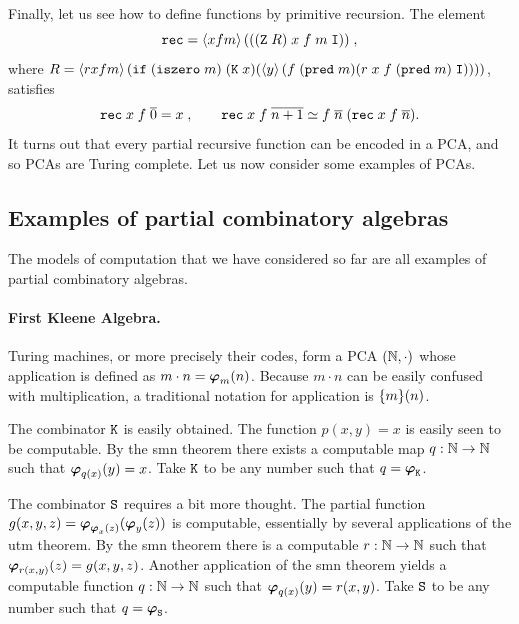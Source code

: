 Finally, let us see how to define functions by primitive recursion.
%
%
%
The element
%
\begin{equation*}
  \mathtt{rec} = \langle x f m \rangle\,(((\mathtt{Z}\; R)\; x\; f\; m\; \mathtt{I})) \;,
\end{equation*}
%
where $R = \langle r x f m \rangle\,(\mathtt{if}\; (\mathtt{iszero}\; m)\; (\mathtt{K}\; x)
  (\langle y \rangle\,(f\; (\mathtt{pred}\; m)(r\; x\; f\; (\mathtt{pred}\; m)\;
    \mathtt{I}))))$, satisfies
%
\begin{equation*}
  \mathtt{rec}\; x\; f\; \overline{0} = x \;,\qquad
  \mathtt{rec}\; x\; f\; \overline{n+1} \simeq
    f\; \overline{n}\; (\mathtt{rec}\; x\; f\; \overline{n}).
\end{equation*}
%
It turns out that every partial recursive function can be encoded in a
PCA, and so PCAs are Turing complete. Let us now consider some
examples of PCAs.

\subsection{Examples of partial combinatory algebras}
\label{sec:pca-examples}

The models of computation that we have considered so far are all
examples of partial combinatory algebras.

\paragraph{First Kleene Algebra.}

Turing machines, or more precisely their codes, form a PCA $(\mathbb{N},
{\cdot})$ whose application is defined as $m \cdot n = \text{\boldmath{$\varphi$}}_{m}(n)$.
Because $m \cdot n$ can be easily confused with multiplication, a
traditional notation for application is $\{m\}(n)$. 

The combinator $\mathtt{K}$ is easily obtained. The function $p(x,y) = x$
is easily seen to be computable. By the smn theorem there exists a
computable map $q : \mathbb{N} \to \mathbb{N}$ such that $\text{\boldmath{$\varphi$}}_{q(x)}(y) = x$. Take
$\mathtt{K}$ to be any number such that $q = \text{\boldmath{$\varphi$}}_{\mathtt{K}}$.

The combinator $\mathtt{S}$ requires a bit more thought. The partial
function $g(x,y,z) = \text{\boldmath{$\varphi$}}_{\text{\boldmath{$\varphi$}}_{x}(z)}(\text{\boldmath{$\varphi$}}_{y}(z))$ is computable,
essentially by several applications of the utm theorem. By the smn
theorem there is a computable $r : \mathbb{N} \to \mathbb{N}$ such that
$\text{\boldmath{$\varphi$}}_{r(x,y)}(z) = g(x,y,z)$. Another application of the smn theorem
yields a computable function $q : \mathbb{N} \to \mathbb{N}$ such that $\text{\boldmath{$\varphi$}}_{q(x)}(y)
= r(x,y)$. Take $\mathtt{S}$ to be any number such that $q = \text{\boldmath{$\varphi$}}_{\mathtt{S}}$.

